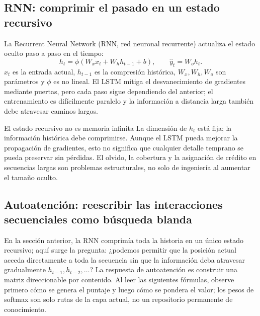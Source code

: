 \subsection{RNN: comprimir el pasado en un estado recursivo}

La Recurrent Neural Network (RNN, red neuronal recurrente) actualiza el estado oculto paso a paso en el tiempo:
\[
h_t=\phi(W_x x_t+W_h h_{t-1}+b),\qquad
\hat{y}_t=W_o h_t.
\]
$x_t$ es la entrada actual, $h_{t-1}$ es la compresión histórica, $W_x,W_h,W_o$ son parámetros y $\phi$ es no lineal. El LSTM mitiga el desvanecimiento de gradientes mediante puertas, pero cada paso sigue dependiendo del anterior; el entrenamiento es difícilmente paralelo y la información a distancia larga también debe atravesar caminos largos.



\begin{warningbox}{El estado recursivo no es memoria infinita}
La dimensión de $h_t$ está fija; la información histórica debe comprimirse. Aunque el LSTM pueda mejorar la propagación de gradientes, esto no significa que cualquier detalle temprano se pueda preservar sin pérdidas. El olvido, la cobertura y la asignación de crédito en secuencias largas son problemas estructurales, no solo de ingeniería al aumentar el tamaño oculto.
\end{warningbox}

\subsection{Autoatención: reescribir las interacciones secuenciales como búsqueda blanda}

En la sección anterior, la RNN comprimía toda la historia en un único estado recursivo; aquí surge la pregunta: ¿podemos permitir que la posición actual acceda directamente a toda la secuencia sin que la información deba atravesar gradualmente $h_{t-1}, h_{t-2}, \ldots$? La respuesta de autoatención es construir una matriz direccionable por contenido. Al leer las siguientes fórmulas, observe primero cómo se genera el puntaje y luego cómo se pondera el valor; los pesos de softmax son solo rutas de la capa actual, no un repositorio permanente de conocimiento.

